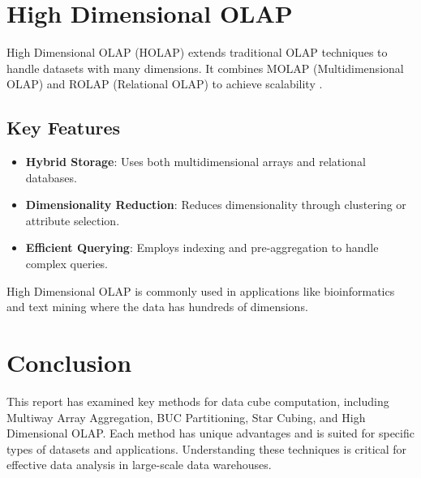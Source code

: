 \documentclass[12pt,a4paper]{article}
\begin{document}
\newpage

\section{High Dimensional OLAP}
High Dimensional OLAP (HOLAP) extends traditional OLAP techniques to handle datasets with many dimensions. It combines MOLAP (Multidimensional OLAP) and ROLAP (Relational OLAP) to achieve scalability \cite{chaudhuri1997overview}.

\subsection*{Key Features}
\begin{itemize}
    \item \textbf{Hybrid Storage}: Uses both multidimensional arrays and relational databases.
    \item \textbf{Dimensionality Reduction}: Reduces dimensionality through clustering or attribute selection.
    \item \textbf{Efficient Querying}: Employs indexing and pre-aggregation to handle complex queries.
\end{itemize}

High Dimensional OLAP is commonly used in applications like bioinformatics and text mining where the data has hundreds of dimensions.

\newpage

\section{Conclusion}
This report has examined key methods for data cube computation, including Multiway Array Aggregation, BUC Partitioning, Star Cubing, and High Dimensional OLAP. Each method has unique advantages and is suited for specific types of datasets and applications. Understanding these techniques is critical for effective data analysis in large-scale data warehouses.



\end{document}
